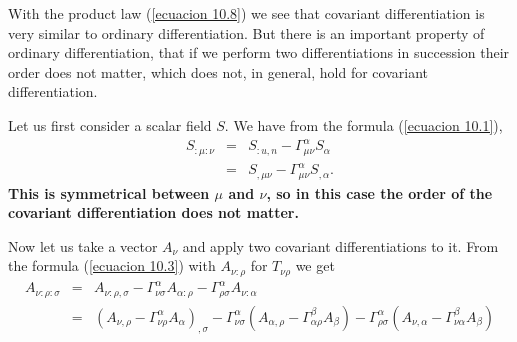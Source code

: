 With the product law (\ref{ecuacion 10.8}) we see that covariant 
differentiation is very similar to ordinary differentiation. But there is an 
important property of ordinary differentiation, that if we perform two 
differentiations in succession their order does not matter, which does not, in 
general, hold for covariant differentiation.

Let us first consider a scalar field $S$. We have from the formula 
(\ref{ecuacion 10.1}),
\begin{equation}
 \label{ecuacion 11.1}
 \begin{array}{rcl}
 S_{:\mu:\nu} & = & S_{:u,n} - \Gamma^{\alpha}_{\mu\nu} S_{\alpha} \\
      & = & S_{,\mu\nu} - \Gamma^{\alpha}_{\mu\nu} S_{,\alpha}.
 \end{array}
\end{equation}
\textbf{This is symmetrical between $\mu$ and $\nu$, so in this 
case the order of the covariant differentiation does not matter.}

Now let us take a vector $A_{\nu}$ and apply two covariant differentiations to 
it. From the formula (\ref{ecuacion 10.3}) with $A_{\nu:\rho}$ for 
$T_{\nu\rho}$ we get
\[
 \begin{array}{rcl}
  A_{\nu:\rho:\sigma} & = & A_{\nu:\rho,\sigma} 
  - \Gamma^{\alpha}_{\nu\sigma} A_{\alpha:\rho}
  - \Gamma^{\alpha}_{\rho\sigma} A_{\nu:\alpha} \\
  & = &  \left(A_{\nu,\rho} - 
              \Gamma^{\alpha}_{\nu\rho} A_{\alpha} \right)_{,\sigma}
  - \Gamma^{\alpha}_{\nu\sigma} \left( 
      A_{\alpha,\rho} - \Gamma^{\beta}_{\alpha\rho} A_{\beta}
  \right)
  - \Gamma^{\alpha}_{\rho\sigma}  \left( 
      A_{\nu,\alpha} - \Gamma^{\beta}_{\nu\alpha} A_{\beta}
  \right)\\
 \end{array}
\]

